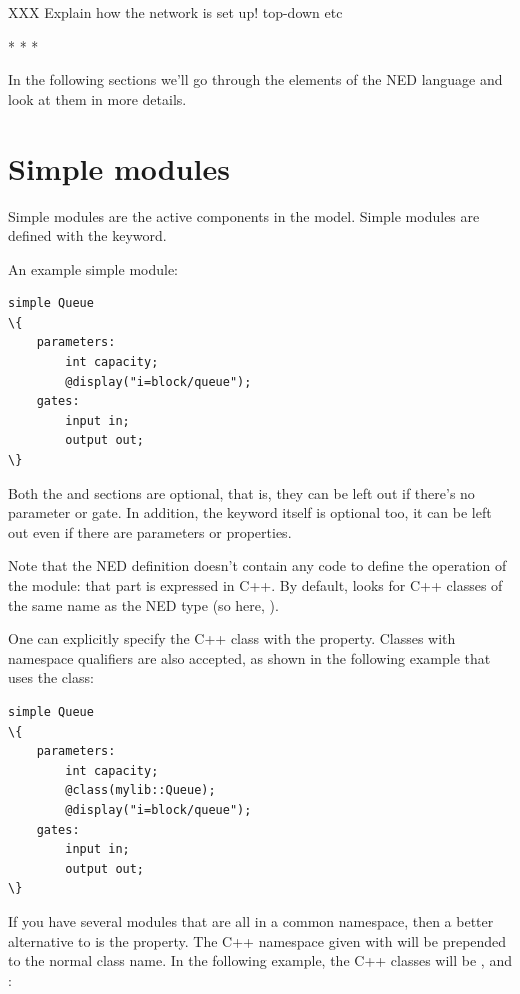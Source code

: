 XXX Explain how the network is set up! top-down etc

\bigskip
\begin{center}* * *\end{center}
\bigskip

In the following sections we'll go through the elements of the NED
language and look at them in more details.



\section{Simple modules}

Simple modules are the active components in the model.
Simple modules are defined with the  keyword.

An example simple module:

\begin{Verbatim}[commandchars=\\\{\}]
simple Queue
\{
    parameters:
        int capacity;
        @display("i=block/queue");
    gates:
        input in;
        output out;
\}
\end{Verbatim}

Both the  and  sections are optional, that is,
they can be left out if there's no parameter or gate. In addition, the
 keyword itself is optional too, it can be left out
even if there are parameters or properties.

Note that the NED definition doesn't contain any code to define the
operation of the module: that part is expressed in C++. By default, {\opp}
looks for C++ classes of the same name as the NED type (so here, ).

One can explicitly specify the C++ class with the  property.
Classes with namespace qualifiers are also accepted, as shown in the following
example that uses the  class:

\begin{Verbatim}[commandchars=\\\{\}]
simple Queue
\{
    parameters:
        int capacity;
        @class(mylib::Queue);
        @display("i=block/queue");
    gates:
        input in;
        output out;
\}
\end{Verbatim}

If you have several modules that are all in a common namespace, then a
better alternative to  is the  property. The
C++ namespace given with  will be prepended to the normal
class name. In the following example, the C++ classes will be
,  and :

